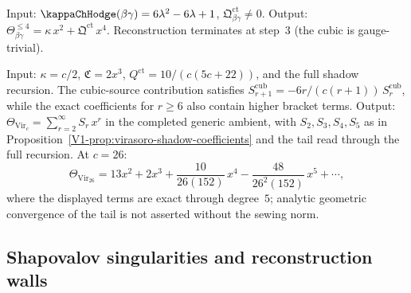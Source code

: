 \begin{example}
Input: $\kappaChHodge(\beta\gamma) = 6\lambda^2 - 6\lambda + 1$,
$\mathfrak{Q}^{\mathrm{ct}}_{\beta\gamma} \neq 0$.
Output:
$\Theta_{\beta\gamma}^{\leq 4} = \kappa\,x^2 +
\mathfrak{Q}^{\mathrm{ct}}\,x^4$.
Reconstruction terminates at step~$3$ (the cubic is
gauge-trivial).
\end{example}

\begin{example}
Input: $\kappa = c/2$, $\mathfrak{C} = 2x^3$,
$Q^{\mathrm{ct}} = 10/(c(5c+22))$, and the full shadow recursion. The
cubic-source contribution satisfies
$S_{r+1}^{\mathrm{cub}} = -6r/(c(r+1))\,S_r^{\mathrm{cub}}$, while the
exact coefficients for $r\geq 6$ also contain higher bracket terms.
Output:
$\Theta_{\mathrm{Vir}_c} = \sum_{r=2}^\infty S_r\,x^r$ in the completed
generic ambient, with $S_2,S_3,S_4,S_5$ as in
Proposition~\ref{V1-prop:virasoro-shadow-coefficients} and the tail
read through the full recursion.
At $c = 26$:
\[
\Theta_{\mathrm{Vir}_{26}} = 13x^2 + 2x^3
+ \frac{10}{26(152)}\,x^4
- \frac{48}{26^2(152)}\,x^5 + \cdots,
\]
where the displayed terms are exact through degree~$5$; analytic
geometric convergence of the tail is not asserted without the sewing
norm.
\end{example}


\subsection{Shapovalov singularities and reconstruction walls}

